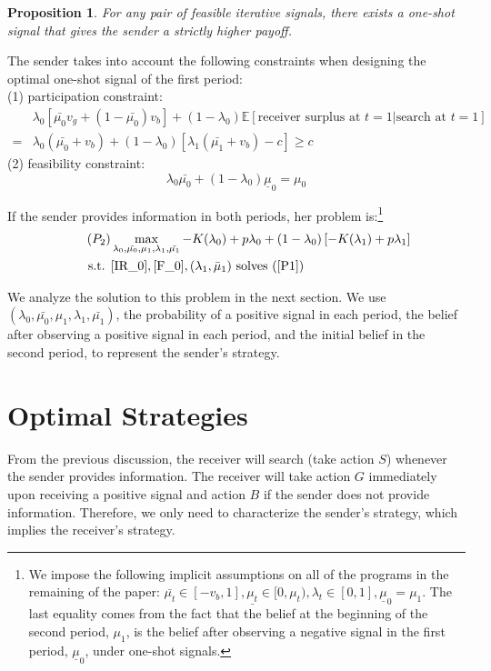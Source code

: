 \documentclass[11pt]{extarticle}
\newtheorem{proposition}{Proposition}
\begin{document}
\begin{proposition}\label{iterative_one-shot}
	For any pair of feasible iterative signals, there exists a one-shot signal that gives the sender a strictly higher payoff.
\end{proposition}

The sender takes into account the following constraints when designing the optimal one-shot signal of the first period:\\
(1) participation constraint:
\begin{align}\label{IR_0}
&\lambda_0 [\bar{\mu_0} v_g + (1 - \bar{\mu_0})v_b] + (1-\lambda_0) \mathbb{E}[\text{receiver surplus at }t=1\vert \text{search at }t=1] \nonumber \\
=&\lambda_0 (\bar{\mu_0} + v_b) + (1-\lambda_0) [\lambda_1(\bar{\mu_1} + v_b)-c] \geq c \tag{$IR_0$}
\end{align}
(2) feasibility constraint:
\begin{equation}\label{F_0}
\lambda_0 \bar{\mu_0} + (1-\lambda_0) \underline{\mu}_0 = \mu_0 \tag{$F_0$}
\end{equation}

If the sender provides information in both periods, her problem is:\footnote{We impose the following implicit assumptions on all of the programs in the remaining of the paper: $\bar{\mu_t} \in [-v_b,1],\underline{\mu_t} \in [0,\mu_t),\lambda_t \in [0,1],\underline{\mu}_0 = \mu_1$. The last equality comes from the fact that the belief at the beginning of the second period, $\mu_1$, is the belief after observing a negative signal in the first period, $\underline{\mu}_0$, under one-shot signals.}
\begin{align}\tag{$P_{2}$} \label{P2}
& \max\limits_{\lambda_0, \bar{\mu_0}, \mu_1, \lambda_1, \bar{\mu_1}} -K(\lambda_0) + p \lambda_0 + (1-\lambda_0) \left[-K(\lambda_1)+p \lambda_1 \right] \nonumber\\
\text{s.t. } &\eqref{IR_0},\eqref{F_0},(\lambda_1,\bar{\mu}_1) \text{ solves (\ref{P1})} \nonumber
\end{align}

We analyze the solution to this problem in the next section. We use $(\lambda_0, \bar{\mu_0}, \mu_1, \lambda_1, \bar{\mu_1})$, the probability of a positive signal in each period, the belief after observing a positive signal in each period, and the initial belief in the second period, to represent the sender's strategy.


\section{Optimal Strategies}
From the previous discussion, the receiver will search (take action $S$) whenever the sender provides information. The receiver will take action $G$ immediately upon receiving a positive signal and action $B$ if the sender does not provide information. Therefore, we only need to characterize the sender's strategy, which implies the receiver's strategy.
\end{document}
